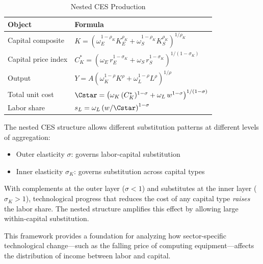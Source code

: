 \begin{table}[H]
\centering
\caption{Nested CES Production}
\label{tab:nested-summary}
\renewcommand{\arraystretch}{1.6}
\begin{tabular}{@{}ll@{}}
\toprule
\textbf{Object} & \textbf{Formula} \\
\midrule
Capital composite & $K = \left( \omega_E^{1-\rho_K} K_E^{\rho_K} + \omega_S^{1-\rho_K} K_S^{\rho_K} \right)^{1/\rho_K}$ \\[6pt]
Capital price index & $C_K^* = \left( \omega_E \, r_E^{1-\sigma_K} + \omega_S \, r_S^{1-\sigma_K} \right)^{1/(1-\sigma_K)}$ \\[6pt]
Output & $Y = A \left( \omega_K^{1-\rho} K^{\rho} + \omega_L^{1-\rho} L^{\rho} \right)^{1/\rho}$ \\[6pt]
Total unit cost & $\Cstar = \left( \omega_K \, (C_K^*)^{1-\sigma} + \omega_L \, w^{1-\sigma} \right)^{1/(1-\sigma)}$ \\[6pt]
Labor share & $s_L = \omega_L \left( w / \Cstar \right)^{1-\sigma}$ \\[6pt]
\bottomrule
\end{tabular}
\end{table}

\begin{callouttip}
The nested CES structure allows different substitution patterns at different levels of aggregation:
\begin{itemize}[nosep]
\item Outer elasticity $\sigma$: governs labor-capital substitution
\item Inner elasticity $\sigma_K$: governs substitution across capital types
\end{itemize}
With complements at the outer layer ($\sigma < 1$) and substitutes at the inner layer ($\sigma_K > 1$), technological progress that reduces the cost of any capital type \emph{raises} the labor share. The nested structure amplifies this effect by allowing large within-capital substitution.

This framework provides a foundation for analyzing how sector-specific technological change---such as the falling price of computing equipment---affects the distribution of income between labor and capital.
\end{callouttip}
